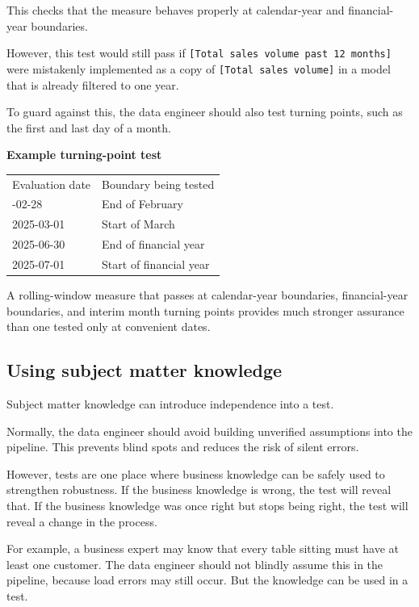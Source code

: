 \documentclass[10pt,openany,10pt]{book}
\newcounter{none}
\let\podeToprule\toprule
\let\podeMidrule\midrule
\let\podeBottomrule\bottomrule
\renewcommand{\toprule}{\arrayrulecolor{pbiGrid}\podeToprule}
\renewcommand{\midrule}{\arrayrulecolor{pbiGrid}\podeMidrule}
\renewcommand{\bottomrule}{\arrayrulecolor{pbiGrid}\podeBottomrule}
\begin{document}
This checks that the measure behaves properly at calendar-year and
financial-year boundaries.

However, this test would still pass if
\texttt{{[}Total\ sales\ volume\ past\ 12\ months{]}} were mistakenly
implemented as a copy of \texttt{{[}Total\ sales\ volume{]}} in a model
that is already filtered to one year.

To guard against this, the data engineer should also test turning
points, such as the first and last day of a month.

\textbf{Example turning-point test}

{\def\LTcaptype{none} %
\begin{longtable}[]{@{}ll@{}}
\toprule\noalign{}
Evaluation date & Boundary being tested \\
\midrule\noalign{}
\endhead
\bottomrule\noalign{}
\endlastfoot
2025-02-28 & End of February \\
2025-03-01 & Start of March \\
2025-06-30 & End of financial year \\
2025-07-01 & Start of financial year \\
\end{longtable}
}

A rolling-window measure that passes at calendar-year boundaries,
financial-year boundaries, and interim month turning points provides
much stronger assurance than one tested only at convenient dates.

\subsection{Using subject matter
knowledge}\label{using-subject-matter-knowledge}

Subject matter knowledge can introduce independence into a test.

Normally, the data engineer should avoid building unverified assumptions
into the pipeline. This prevents blind spots and reduces the risk of
silent errors.

However, tests are one place where business knowledge can be safely used
to strengthen robustness. If the business knowledge is wrong, the test
will reveal that. If the business knowledge was once right but stops
being right, the test will reveal a change in the process.

For example, a business expert may know that every table sitting must
have at least one customer. The data engineer should not blindly assume
this in the pipeline, because load errors may still occur. But the
knowledge can be used in a test.
\end{document}
